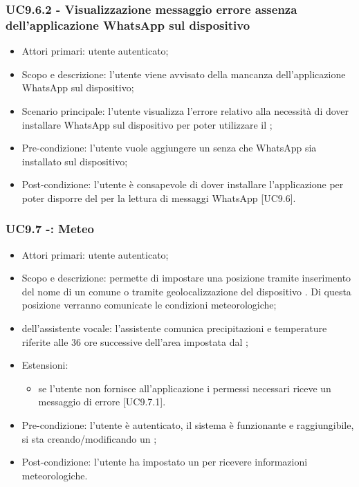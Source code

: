 \subsubsection{UC9.6.2 - Visualizzazione messaggio errore assenza dell'applicazione WhatsApp sul dispositivo}
\begin{itemize}
	\item  Attori primari: utente autenticato;
	\item  Scopo e descrizione: l'utente viene avvisato della mancanza dell'applicazione WhatsApp sul dispositivo;
	\item  Scenario principale: l'utente visualizza l'errore relativo alla necessità di dover installare WhatsApp sul dispositivo per poter utilizzare il ;
	\item  Pre-condizione: l'utente vuole aggiungere un  senza che WhatsApp sia installato sul dispositivo;
	\item  Post-condizione: l'utente è consapevole di dover installare l'applicazione per poter disporre del  per la lettura di messaggi WhatsApp [UC9.6].
\end{itemize}
\subsubsection{UC9.7 -: Meteo}
\begin{itemize}
	\item  Attori primari: utente autenticato;
	\item  Scopo e descrizione: permette di impostare una posizione tramite inserimento del nome di un comune o tramite geolocalizzazione del dispositivo . Di questa posizione verranno comunicate le condizioni meteorologiche;
	\item  {} dell'assistente vocale: l'assistente comunica precipitazioni e temperature riferite alle 36 ore successive dell'area impostata dal ;
	\item  Estensioni: 
		   \begin{itemize}
				\item se l'utente non fornisce all'applicazione i permessi necessari riceve un messaggio di errore [UC9.7.1].
		   \end{itemize}
	\item  Pre-condizione: l'utente è autenticato, il sistema è funzionante e raggiungibile, si sta creando/modificando un ;
	\item  Post-condizione: l'utente ha impostato un  per ricevere informazioni meteorologiche.
\end{itemize}
